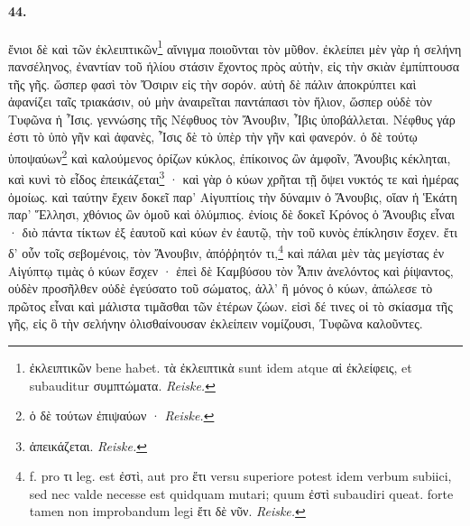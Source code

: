 \documentclass[a4paper, 11pt, oneside, polutonikogreek, german, landscape]{article}
\begin{document}
\paragraph{44.}
ἔνιοι δὲ καὶ τῶν ἐκλειπτικῶν\footnote{ἐκλειπτικῶν bene habet. τὰ ἐκλειπτικὰ sunt idem atque αἱ ἐκλείφεις, et subauditur συμπτώματα. \emph{Reiske.}} αἴνιγμα ποιοῦνται τὸν μῦθον. ἐκλείπει μὲν γὰρ ἡ σελήνη πανσέληνος, ἐναντίαν τοῦ ἡλίου στάσιν ἔχοντος πρὸς αὐτὴν, εἰς τὴν σκιὰν ἐμπίπτουσα τῆς γῆς. ὥσπερ φασὶ τὸν Ὄσιριν εἰς τὴν σορόν. αὐτὴ δὲ πάλιν ἀποκρύπτει καὶ ἀφανίζει ταῖς τριακάσιν, οὐ μὴν ἀναιρεῖται παντάπασι τὸν ἥλιον, ὥσπερ οὐδὲ τὸν Τυφῶνα ἡ Ἶσις. γεννώσης τῆς Νέφθυος τὸν Ἄνουβιν, Ἶβις ὑποβάλλεται. Νέφθυς γάρ ἐστι τὸ ὑπὸ γῆν καὶ ἀφανὲς, Ἶσις δὲ τὸ ὑπὲρ τὴν γῆν καὶ φανερόν. ὁ δὲ τούτῳ ὑποψαύων\footnote{ὁ δὲ τούτων ἐπιψαύων · \emph{Reiske.}} καὶ καλούμενος ὁρίζων κύκλος, ἐπίκοινος ὢν ἀμφοῖν, Ἄνουβις κέκληται, καὶ κυνὶ τὸ εἶδος ἐπεικάζεται\footnote{ἀπεικάζεται. \emph{Reiske.}} · καὶ γὰρ ὁ κύων χρῆται τῇ ὄψει νυκτός τε καὶ ἡμέρας ὁμοίως. καὶ ταύτην ἔχειν δοκεῖ παρ' Αἰγυπτίοις τὴν δύναμιν ὁ Ἄνουβις, οἵαν ἡ Ἑκάτη παρ' Ἕλλησι, χθόνιος ὢν ὁμοῦ καὶ ὀλύμπιος. ἐνίοις δὲ δοκεῖ Κρόνος ὁ Ἄνουβις εἶναι · διὸ πάντα τίκτων ἐξ ἑαυτοῦ καὶ κύων ἐν ἑαυτῷ, τὴν τοῦ κυνὸς ἐπίκλησιν ἔσχεν. ἔτι δ' οὖν τοῖς σεβομένοις, τὸν Ἄνουβιν, ἀπόῤῥητόν τι,\footnote{f. pro τι leg. est ἐστὶ, aut pro ἔτι versu superiore potest idem verbum subiici, sed nec valde necesse est quidquam mutari; quum ἐστὶ subaudiri queat. forte tamen non improbandum legi ἔτι δὲ νῦν. \emph{Reiske.}} καὶ πάλαι μὲν τὰς μεγίστας ἐν Αἰγύπτῳ τιμὰς ὁ κύων ἔσχεν · ἐπεὶ δὲ Καμβύσου τὸν Ἆπιν ἀνελόντος καὶ ῥίψαντος, οὐδὲν προσῆλθεν οὐδὲ ἐγεύσατο τοῦ σώματος, ἀλλ' ἢ μόνος ὁ κύων, ἀπώλεσε τὸ πρῶτος εἶναι καὶ μάλιστα τιμᾶσθαι τῶν ἑτέρων ζώων. εἰσὶ δέ τινες οἱ τὸ σκίασμα τῆς γῆς, εἰς ὃ τὴν σελήνην ὀλισθαίνουσαν ἐκλείπειν νομίζουσι, Τυφῶνα καλοῦντες.
\end{document}
